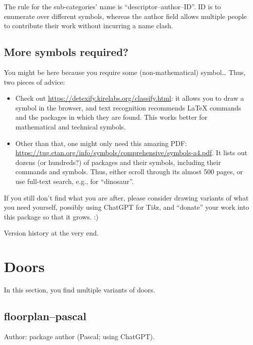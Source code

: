 \documentclass{article}
\begin{document}
The rule for the sub-categories' name is ``descriptor--author--ID''. ID is to enumerate over different symbols, whereas the author field allows multiple people to contribute their work without incurring a name clash.

\subsection*{More symbols required?}

You might be here because you require some (non-mathematical) symbol\dots{} Thus, two pieces of advice:

\begin{itemize}
  \item Check out \url{https://detexify.kirelabs.org/classify.html}: it allows you to draw a symbol in the browser, and text recognition recommends \LaTeX{} commands and the packages in which they are found. This works better for mathematical and technical symbols.
  \item Other than that, one might only need this amazing PDF:
  \url{https://tug.ctan.org/info/symbols/comprehensive/symbols-a4.pdf}. 
  It lists out dozens (or hundreds?) of packages and their symbols, including their commands and symbols. Thus, either scroll through its almost 500 pages, or use full-text search, e.g., for ``dinosaur''.  
\end{itemize}

If you still don't find what you are after, please consider drawing variants of what you need yourself, possibly using ChatGPT for Ti\textit{k}z, and ``donate'' your work into this package so that it grows. :)

Version history at the very end.

\clearpage

\section{Doors}

In this section, you find multiple variants of doors.


\subsection{floorplan--pascal}

Author: package author (Pascal; using ChatGPT).
\end{document}
